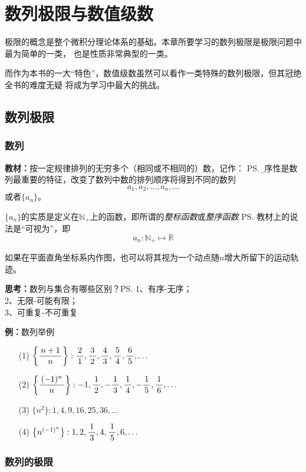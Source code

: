 \setcounter{chapter}{1}

\chapter{数列极限与数值级数}

极限的概念是整个微积分理论体系的基础。本章所要学习的数列极限是极限问题中最为简单的一类，
也是性质非常典型的一类。

而作为本书的一大“特色”，数值级数虽然可以看作一类特殊的数列极限，但其冠绝全书的难度无疑
将成为学习中最大的挑战。

\section{数列极限}

\subsection{数列}

{\bf 教材：}按一定规律排列的无穷多个（相同或不相同的）数，记作：
\ps{\b 有序性是数列最重要的特征，改变了数列中数的排列顺序将得到不同的数列}
$$a_1,a_2,\ldots,a_n,\ldots$$
或者$\{a_n\}$。

$\{a_n\}$的实质是定义在$\mathbb{N}_+$上的函数，即所谓的{\it 整标函数}或{\it 整序函数}
\ps{教材上的说法是“可视为”}，即
$$a_n:\mathbb{N}_+\mapsto\mathbb{R}$$

如果在平面直角坐标系内作图，也可以将其视为一个动点随$n$增大所留下的运动轨迹。

{\bf 思考：}数列与集合有哪些区别？\ps{1、有序-无序；\\ 2、无限-可能有限；\\ 3、可重复-不可重复}

{\bf 例：}数列举例

\begin{enumerate}[(1)]
  \setlength{\itemindent}{1cm}
  \item[(1)] $\left\{\displaystyle\frac{\,{n+1}\,}{\,{n}\,}\right\}:\displaystyle\frac{\,{2}\,}{\,{1}\,},\displaystyle\frac{\,{3}\,}{\,{2}\,},\displaystyle\frac{\,{4}\,}{\,{3}\,},\displaystyle\frac{\,{5}\,}{\,{4}\,},\displaystyle\frac{\,{6}\,}{\,{5}\,},\ldots$
  \item[(2)] $\left\{\displaystyle\frac{\,{(-1)^n}\,}{\,{n}\,}\right\}:-1,\displaystyle\frac{\,{1}\,}{\,{2}\,},-\displaystyle\frac{\,{1}\,}{\,{3}\,},\displaystyle\frac{\,{1}\,}{\,{4}\,},-\displaystyle\frac{\,{1}\,}{\,{5}\,},\displaystyle\frac{\,{1}\,}{\,{6}\,},\ldots$
  \item[(3)] $\{n^2\}:1,4,9,16,25,36,\ldots$
  \item[(4)] $\left\{n^{(-1)^n}\right\}:1,2,\displaystyle\frac{\,{1}\,}{\,{3}\,},4,\displaystyle\frac{\,{1}\,}{\,{5}\,},6,\ldots$
\end{enumerate}

\subsection{数列的极限}

